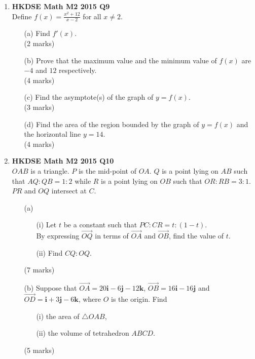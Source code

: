 \documentclass{report}
\begin{document}
\begin{enumerate}
	\item \textbf{HKDSE Math M2 2015 Q9}\\
	Define $f(x) = \displaystyle\frac{x^2+12}{x - 2}$ for all $x \neq 2$.  
	\begin{enumerate}
		\item [(a)]Find $f'(x)$. \\(2 marks)
		\item [(b)]Prove that the maximum value and the minimum value of $f(x)$ are $-4$ and $12$ respectively. \\(4 marks)
		\item [(c)]Find the asymptote(s) of the graph of $y = f(x)$. \\(3 marks) 
		\item [(d)]Find the area of the region bounded by the graph of $y = f(x)$ and the horizontal line $y = 14$.  \\(4 marks)
	\end{enumerate}


	\item \textbf{HKDSE Math M2 2015 Q10}\\
	$OAB$ is a triangle. $P$ is the mid-point of $OA$. $Q$ is a point lying on $AB$ such that $AQ : QB = 1 : 2$ while $R$ is a point lying on $OB$ such that $OR : RB = 3:1$. $PR$ and $OQ$ intersect at $C$. 
	\begin{enumerate}
		\item [(a)]		
		\begin{enumerate}
			\item [(i)]Let $t$ be a constant such that $PC : CR = t : (1-t)$.\\
				By expressing $\overrightarrow{OQ}$ in terms of $\overrightarrow{OA}$ and $\overrightarrow{OB}$, find the value of $t$. 
			\item [(ii)]Find $CQ:OQ$. 
		\end{enumerate}
		(7 marks)
		\item [(b)]Suppose that $\overrightarrow{OA} = 20\textbf{i} -6 \textbf{j} -12\textbf {k}$, $\overrightarrow{OB} = 16\textbf{i} -16 \textbf{j}$ and $\overrightarrow{OD} = \textbf{i} +3 \textbf{j} -6\textbf {k}$, where $O$ is the origin. Find
		\begin{enumerate}
			\item [(i)]the area of $\triangle OAB$, 
			\item [(ii)]the volume of tetrahedron $ABCD$.
		\end{enumerate}
		(5 marks)
	\end{enumerate}




\end{enumerate}
\end{document}
